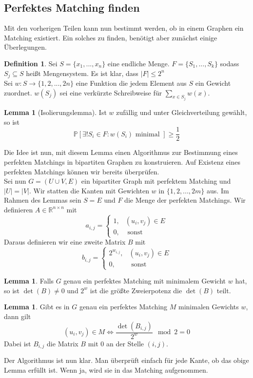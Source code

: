 \documentclass[a4paper, 12pt]{article}
\theoremstyle{plain}
\theoremstyle{definition}
\newtheorem{definition}[theorem]{Definition} %
\theoremstyle{lemma}
\newtheorem{lemma}[theorem]{Lemma}
\theoremstyle{remark}
\theoremstyle{corollary}
\theoremstyle{example}
\begin{document}
	\subsection{Perfektes Matching finden}
	Mit den vorherigen Teilen kann nun bestimmt werden, ob in einem Graphen ein Matching existiert. Ein solches zu finden, benötigt aber zunächst einige Überlegungen.
	\begin{definition}
		Sei $S = \{x_1,...,x_n\}$ eine endliche Menge. $F = \{S_1,...,S_k\}$ sodass $S_j \subseteq S$ heißt Mengensystem. Es ist klar, dass $\left|F\right| \leq 2^n$\\
		Sei $w:S \to \{1,2,...,2n\}$ eine Funktion die jedem Element aus $S$ ein Gewicht zuordnet. $w(S_j)$ sei eine verkürzte Schreibweise für $\sum_{x \in S_j} w(x)$.
	\end{definition}
	\begin{lemma}[Isolierungslemma]
		Ist $w$ zufällig und unter Gleichverteilung gewählt, so ist \[\mathbb{P}[\exists ! S_i \in F : w(S_i) \text{ minimal }] \geq \frac{1}{2}\]
	\end{lemma}
	Die Idee ist nun, mit diesem Lemma einen Algorithmus zur Bestimmung eines perfekten Matchings in bipartiten Graphen zu konstruieren. Auf Existenz eines perfekten Matchings können wir bereits überprüfen.\\
	Sei nun $G = (U\cup V,E)$ ein bipartiter Graph mit perfektem Matching und $\left|U\right| = \left|V\right|$. Wir statten die Kanten mit Gewichten $w$ in $\{1,2,...,2m\}$ aus. Im Rahmen des Lemmas sein $S = E$ und $F$ die Menge der perfekten Matchings. Wir definieren $A \in \mathbb{R}^{n\times n}$ mit \[a_{i,j} = \begin{cases}
		1, & (u_i,v_j) \in E\\
		0, & \text{ sonst}
	\end{cases}\]
	Daraus definieren wir eine zweite Matrix $B$ mit \[b_{i,j} = \begin{cases}
		2^{w_{i,j}}, & (u_i,v_j) \in E\\
		0, & \text{ sonst}
	\end{cases}\]
	\begin{lemma}
		Falls $G$ genau ein perfektes Matching mit minimalem Gewicht $w$ hat, so ist $\det(B) \neq 0$ und $2^w$ ist die größte Zweierpotenz die $\det(B)$ teilt.
	\end{lemma}
	\begin{lemma}
		Gibt es in $G$ genau ein perfektes Matching $M$ minimalen Gewichts $w$, dann gilt \[(u_i,v_j) \in M \Leftrightarrow \frac{\det(B_{i,j})}{2^w} \mod 2 = 0\] Dabei ist $B_{i,j}$ die Matrix $B$ mit 0 an der Stelle $(i,j)$.
	\end{lemma}
	Der Algorithmus ist nun klar. Man überprüft einfach für jede Kante, ob das obige Lemma erfüllt ist. Wenn ja, wird sie in das Matching aufgenommen.
\end{document}
